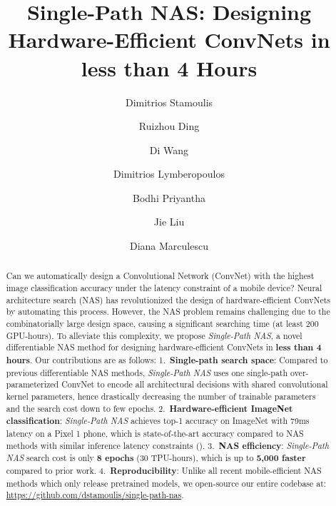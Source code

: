 \documentclass[runningheads]{llncs}
\begin{document}
\title{Single-Path NAS: Designing Hardware-Efficient ConvNets in less than 4 Hours}
\author{Dimitrios Stamoulis \and
Ruizhou Ding \and
Di Wang \and
Dimitrios Lymberopoulos \and
Bodhi Priyantha \and
Jie Liu \and
Diana Marculescu}

\maketitle              \begin{abstract}
Can we automatically design a Convolutional Network (ConvNet) with the
highest image classification accuracy under the latency constraint 
of a mobile device? Neural architecture search (NAS) has revolutionized
the design of hardware-efficient ConvNets by automating this process.
However, the NAS problem remains challenging due to the combinatorially large 
design space, causing a significant searching time (at least 200 GPU-hours). 
To alleviate this complexity, we propose \textit{Single-Path NAS}, a novel 
differentiable NAS method for designing hardware-efficient ConvNets 
in \textbf{less than 4 hours}.  Our contributions are as follows: 
1.~\textbf{Single-path search space}: Compared to previous differentiable 
NAS methods, \textit{Single-Path NAS} uses one single-path over-parameterized 
ConvNet to encode all architectural decisions with shared convolutional
kernel parameters, hence drastically decreasing the number of
trainable parameters and the search cost down to few epochs. 
2.~\textbf{Hardware-efficient ImageNet classification}: 
\textit{Single-Path NAS} achieves  top-1 accuracy on 
ImageNet with 79ms latency on a Pixel 1 phone, which is 
state-of-the-art accuracy compared to NAS methods 
with similar inference latency constraints (). 3.~\textbf{NAS efficiency}: 
\textit{Single-Path NAS} search cost is only 
\textbf{8 epochs} (30 TPU-hours), which is up to \textbf{5,000 faster}
compared to prior work. 4.~\textbf{Reproducibility}:
Unlike all recent mobile-efficient NAS methods which only 
release pretrained models, we open-source our entire codebase at:
\url{https://github.com/dstamoulis/single-path-nas}.

\end{abstract}
\end{document}
